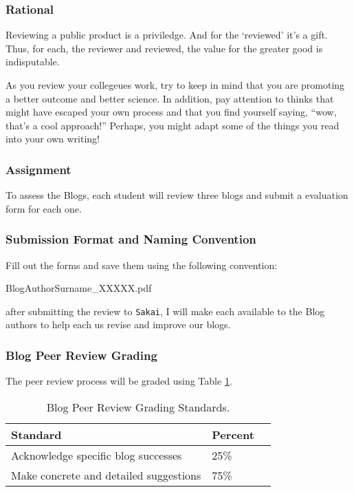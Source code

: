 
\subsubsection{Rational}

Reviewing a public product is a priviledge. And for the `reviewed' it's a gift. Thus, for each, the reviewer and reviewed, the value for the greater good is indisputable. 

As you review your collegeues work, try to keep in mind that you are promoting a better outcome and better science. In addition, pay attention to thinks that might have escaped your own process and that you find yourself saying, ``wow, that's a cool approach!''  Perhaps, you might adapt some of the things you read into your own writing!

\subsubsection{Assignment}

To assess the Blogs, each student will review three blogs and submit a evaluation form for each one.

\subsubsection{Submission Format and Naming Convention}

Fill out the forms and save them using the following convention:

\begin{center}
BlogAuthorSurname\_XXXXX.pdf
\end{center}

\noindent after submitting the review to \texttt{Sakai}, I will make each available to the Blog authors to help each us revise and improve our blogs. 

\subsubsection{Blog Peer Review Grading}

The peer review process will be graded using Table \ref{tab:blogpeerreviewgrading}. 

\begin{table}[h]
\caption{Blog Peer Review Grading Standards.}
\label{tab:blogpeerreviewgrading}
\begin{tabular}{llr}\hline
Standard          &   Percent   & \\ \hline\hline
Acknowledge specific blog  successes & 25\% \\
Make concrete and detailed suggestions & 75\% \\
\hline
\end{tabular}
\end{table}

